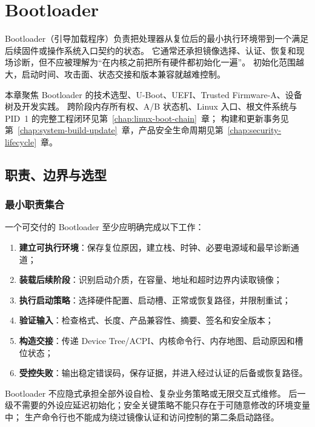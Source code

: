 \chapter{Bootloader}
\label{chap:bootloader}

Bootloader（引导加载程序）负责把处理器从复位后的最小执行环境带到一个满足后续固件或操作系统入口契约的状态。
它通常还承担镜像选择、认证、恢复和现场诊断，但不应被理解为“在内核之前把所有硬件都初始化一遍”。
初始化范围越大，启动时间、攻击面、状态交接和版本兼容就越难控制。

本章聚焦 Bootloader 的技术选型、U-Boot、UEFI、Trusted Firmware-A、设备树及开发实践。
跨阶段内存所有权、A/B 状态机、Linux 入口、根文件系统与 PID~1 的完整工程闭环见第~\ref{chap:linux-boot-chain}~章；
构建和更新事务见第~\ref{chap:system-build-update}~章，产品安全生命周期见第~\ref{chap:security-lifecycle}~章。

\section{职责、边界与选型}

\subsection{最小职责集合}

一个可交付的 Bootloader 至少应明确完成以下工作：

\begin{enumerate}
  \item \textbf{建立可执行环境}：保存复位原因，建立栈、时钟、必要电源域和最早诊断通道；
  \item \textbf{装载后续阶段}：识别启动介质，在容量、地址和超时边界内读取镜像；
  \item \textbf{执行启动策略}：选择硬件配置、启动槽、正常或恢复路径，并限制重试；
  \item \textbf{验证输入}：检查格式、长度、产品兼容性、摘要、签名和安全版本；
  \item \textbf{构造交接}：传递 Device Tree/ACPI、内核命令行、内存地图、启动原因和槽位状态；
  \item \textbf{受控失败}：输出稳定错误码，保存证据，并进入经过认证的后备或恢复路径。
\end{enumerate}

Bootloader 不应隐式承担全部外设自检、复杂业务策略或无限交互式维修。
后一级不需要的外设应延迟初始化；安全关键策略不能只存在于可随意修改的环境变量中；
生产命令行也不能成为绕过镜像认证和访问控制的第二条启动路径。

